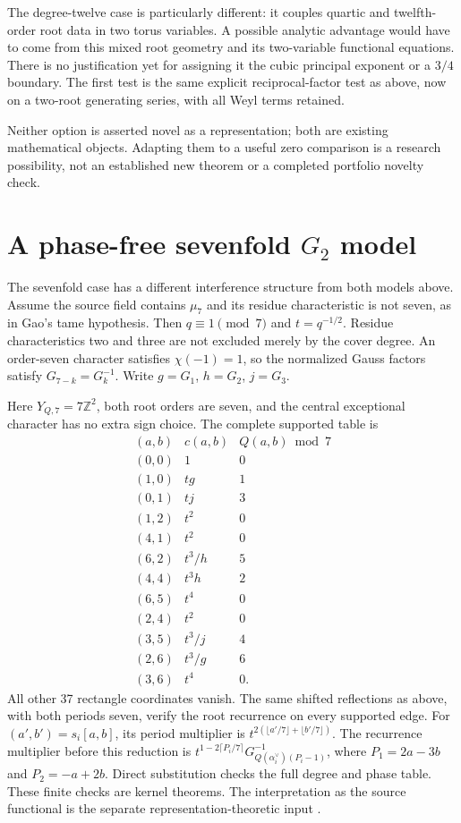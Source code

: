 \documentclass[11pt]{article}
\newcommand{\ZZ}{\mathbb Z}
\begin{document}
The degree-twelve case is particularly different: it couples quartic
and twelfth-order root data in two torus variables. A possible analytic
advantage would have to come from this mixed root geometry and its
two-variable functional equations. There is no justification yet for
assigning it the cubic principal exponent or a $3/4$ boundary.
The first test is the same explicit reciprocal-factor test as above,
now on a two-root generating series, with all Weyl terms retained.

Neither option is asserted novel as a representation; both are existing
mathematical objects. Adapting them to a useful zero comparison is a
research possibility, not an established new theorem or a completed
portfolio novelty check.

\section{A phase-free sevenfold $G_2$ model}
\label{sec:G2-seven}

The sevenfold case has a different interference structure from both
models above. Assume the source field contains $\mu_7$ and its residue
characteristic is not seven, as in Gao's tame hypothesis.
Then $q\equiv1\pmod7$ and $t=q^{-1/2}$.
Residue characteristics two and three are not excluded merely by the
cover degree. An order-seven character satisfies $\chi(-1)=1$, so
the normalized Gauss factors satisfy $G_{7-k}=G_k^{-1}$.
Write $g=G_1$, $h=G_2$, $j=G_3$.

Here $Y_{Q,7}=7\ZZ^2$, both root orders are seven, and the central
exceptional character has no extra sign choice.
The complete supported table is
\[
\begin{array}{c|c|c}
(a,b)&c(a,b)&Q(a,b)\bmod7\\ \hline
(0,0)&1&0\\
(1,0)&tg&1\\
(0,1)&tj&3\\
(1,2)&t^2&0\\
(4,1)&t^2&0\\
(6,2)&t^3/h&5\\
(4,4)&t^3h&2\\
(6,5)&t^4&0\\
(2,4)&t^2&0\\
(3,5)&t^3/j&4\\
(2,6)&t^3/g&6\\
(3,6)&t^4&0 .
\end{array}
\]
All other 37 rectangle coordinates vanish.
The same shifted reflections as above, with both periods seven,
verify the root recurrence on every supported edge.
For $(a',b')=s_i[a,b]$, its period multiplier is
$t^{2(\lfloor a'/7\rfloor+\lfloor b'/7\rfloor)}$.
The recurrence multiplier before this reduction is
$t^{1-2\lceil P_i/7\rceil}
G_{Q(\alpha_i^\vee)(P_i-1)}^{-1}$, where
$P_1=2a-3b$ and $P_2=-a+2b$.
Direct substitution checks the full degree and phase table.
These finite checks are kernel theorems. The interpretation as the
source functional is the separate representation-theoretic input
\cite[Corollary 3.7 and Theorem 7.1]{Gao}.
\end{document}

